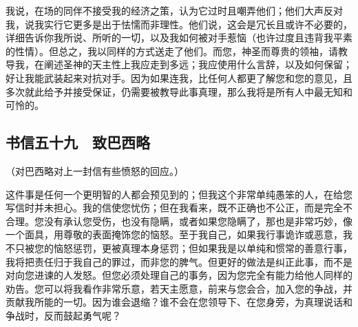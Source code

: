 我说，在场的同伴不接受我的经济之策，认为它过时且嘲弄他们；他们大声反对我，说我实行它更多是出于怯懦而非理性。他们说，这会是冗长且或许不必要的，详细告诉你我所说、所听的一切，以及我如何被对手惹恼（也许过度且违背我平素的性情）。但总之，我以同样的方式送走了他们。而您，神圣而尊贵的领袖，请教导我，在阐述圣神的天主性上我应走到多远；我应使用什么言辞，以及如何保留；好让我能武装起来对抗对手。因为如果连我，比任何人都更了解您和您的意见，且多次就此给予并接受保证，仍需要被教导此事真理，那么我将是所有人中最无知和可怜的。\par


\subsection{书信五十九　致巴西略}

（对巴西略对上一封信有些愤怒的回应。）\par

这件事是任何一个更明智的人都会预见到的；但我这个非常单纯愚笨的人，在给您写信时并未担心。我的信使您忧伤；但在我看来，既不正确也不公正，而是完全不合理。您没有承认您受伤，也没有隐瞒，或者如果您隐瞒了，那也是非常巧妙，像一个面具，用尊敬的表面掩饰您的恼怒。至于我自己，如果我行事诡诈或恶意，我不只被您的恼怒惩罚，更被真理本身惩罚；但如果我是以单纯和惯常的善意行事，我将把责任归于我自己的罪过，而非您的脾气。但更好的做法是纠正此事，而不是对向您进谏的人发怒。但您必须处理自己的事务，因为您完全有能力给他人同样的劝告。您可以将我看作非常乐意，若天主愿意，前来与您会合，加入您的争战，并贡献我所能的一切。因为谁会退缩？谁不会在您领导下、在您身旁，为真理说话和争战时，反而鼓起勇气呢？\par


